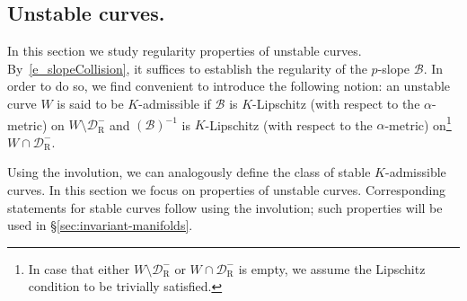 \documentclass[AHL, Unicode, longabstracts,published]{cedram}
\newcommand{\inv}{^{-1}}
\newcommand{\cB}{\mathcal{B}}
\newcommand{\pslope}{\mathcal{B}}
\newcommand{\cell}{\mathcal{D}}
\newcommand{\recoPrivate}{\mathrm{R}}
\newcommand{\reco}{{\cell^-_{\recoPrivate}}}
\newcommand{\ppPrivate}[2]{#1^{#2}}
\newcommand{\prePrivate}[1]{\ppPrivate{#1}{-}}
\newcommand{\prpslope}{\prePrivate{\pslope}}
\newcommand{\admiss}{admissible}
\newcommand{\admName}{\alpha^{+}}
\renewcommand{\admName}{\alpha}
\renewcommand{\prpslope}{\cB}
\renewcommand{\prpslope}{\cB}
\renewcommand{\prpslope}{\cB}
\begin{document}
\subsection{Unstable curves.}\label{sec:unstable-curves}
In this section we study regularity properties of unstable curves. By~\eqref{e_slopeCollision}, it suffices to establish the regularity of the $p$-slope $\prpslope$. In order to do so, we find convenient to introduce the following notion: an unstable curve $W$ is said to be $K$-\admiss{} if $\prpslope$ is $K$-Lipschitz (with respect to the $\admName$-metric) on $W\setminus\reco$ and $(\prpslope)\inv$ is $K$-Lipschitz (with respect to the $\admName$-metric) on\footnote{ In case that either $W\setminus\reco$ or $W\cap\reco$ is empty, we assume the Lipschitz condition to be trivially satisfied.} $W\cap\reco$.

Using the involution, we can analogously define the class of stable $K$-\admiss{} curves. In this section we focus on properties of unstable curves. Corresponding statements for stable curves follow using the involution; such properties will be used in \S\ref{sec:invariant-manifolds}.
\end{document}
